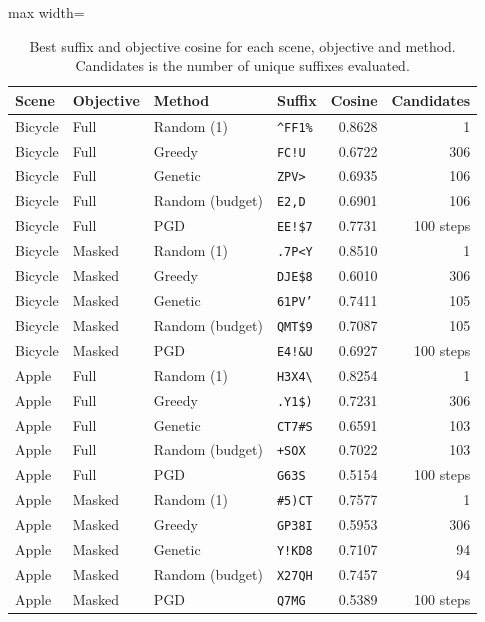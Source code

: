 \documentclass[11pt]{article}
\begin{document}
\begin{table}[htbp]
\centering
\small
\caption{Best suffix and objective cosine for each scene, objective and method. Candidates is the number of unique suffixes evaluated.}
\label{tab:search}
\begin{adjustbox}{max width=\linewidth}
\begin{tabular}{@{}llllrr@{}}
\toprule
\textbf{Scene} & \textbf{Objective} & \textbf{Method} & \textbf{Suffix} & \textbf{Cosine} & \textbf{Candidates} \\
\midrule
Bicycle & Full & Random (1) & \texttt{\textasciicircum{}FF1\%} & 0.8628 & 1 \\
Bicycle & Full & Greedy & \texttt{FC\textperiodcentered{}!U} & 0.6722 & 306 \\
Bicycle & Full & Genetic & \texttt{\textbar{}ZPV\textgreater{}} & 0.6935 & 106 \\
Bicycle & Full & Random (budget) & \texttt{E2\textbar{},D} & 0.6901 & 106 \\
Bicycle & Full & PGD & \texttt{EE!\$7} & 0.7731 & 100 steps\\
\addlinespace
Bicycle & Masked & Random (1) & \texttt{.7P\textless{}Y} & 0.8510 & 1 \\
Bicycle & Masked & Greedy & \texttt{DJE\$8} & 0.6010 & 306 \\
Bicycle & Masked & Genetic & \texttt{61PV'} & 0.7411 & 105 \\
Bicycle & Masked & Random (budget) & \texttt{QMT\$9} & 0.7087 & 105 \\
Bicycle &Masked & PGD & \texttt{E4!\&U} & 0.6927 &100 steps\\
\addlinespace
Apple & Full & Random (1) & \texttt{H3X4\textbackslash{}} & 0.8254 & 1 \\
Apple & Full & Greedy & \texttt{.Y1\$)} & 0.7231 & 306 \\
Apple & Full & Genetic & \texttt{CT7\#S} & 0.6591 & 103 \\
Apple & Full & Random (budget) & \texttt{+\textbar{}SOX} & 0.7022 & 103 \\
Apple & Full & PGD & \texttt{G63S\textbar{}} &0.5154 &100 steps\\
\addlinespace
Apple & Masked & Random (1) & \texttt{\#5)CT} & 0.7577 & 1 \\
Apple & Masked & Greedy & \texttt{GP38I} & 0.5953 & 306 \\
Apple & Masked & Genetic & \texttt{Y!KD8} & 0.7107 & 94 \\
Apple & Masked & Random (budget) & \texttt{X27QH} & 0.7457 & 94 \\
Apple & Masked & PGD & \texttt{Q7\textbar{}MG} & 0.5389 & 100 steps \\
\bottomrule
\end{tabular}
\end{adjustbox}
\end{table}
\end{document}
